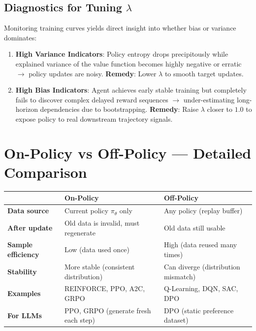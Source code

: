 \subsection{Diagnostics for Tuning $\lambda$}
\label{diagnostics-for-tuning-lambda}

Monitoring training curves yields direct insight into whether bias or variance dominates:

\begin{enumerate}
  \item \textbf{High Variance Indicators}: Policy entropy drops precipitously while explained variance of the value function becomes highly negative or erratic $\rightarrow$ policy updates are noisy. \textbf{Remedy}: Lower $\lambda$ to smooth target updates.
  \item \textbf{High Bias Indicators}: Agent achieves early stable training but completely fails to discover complex delayed reward sequences $\rightarrow$ under-estimating long-horizon dependencies due to bootstrapping. \textbf{Remedy}: Raise $\lambda$ closer to $1.0$ to expose policy to real downstream trajectory signals.
\end{enumerate}

\section{On-Policy vs Off-Policy --- Detailed Comparison}
\label{on-policy-vs-off-policy-detailed-comparison}

\begin{tabular}{@{}lp{5cm}p{8cm}@{}}
\toprule
 & \textbf{On-Policy} & \textbf{Off-Policy} \\
\midrule
\textbf{Data source} & Current policy $\pi_\theta$ only & Any policy (replay buffer) \\
\textbf{After update} & Old data is invalid, must regenerate & Old data still usable \\
\textbf{Sample efficiency} & Low (data used once) & High (data reused many times) \\
\textbf{Stability} & More stable (consistent distribution) & Can diverge (distribution mismatch) \\
\textbf{Examples} & REINFORCE, PPO, A2C, GRPO & Q-Learning, DQN, SAC, DPO \\
\textbf{For LLMs} & PPO, GRPO (generate fresh each step) & DPO (static preference dataset) \\
\bottomrule
\end{tabular}

